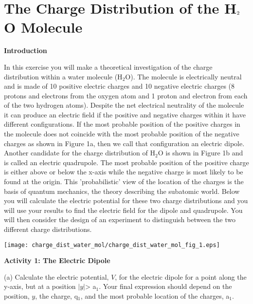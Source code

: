 
\section{The Charge Distribution of the H\protect\( _{2}\protect \)O Molecule}

\makelabheader %

\textbf{Introduction}

In this exercise you will make a theoretical investigation of the
charge distribution within a water molecule (H\( _{2} \)O). The molecule
is electrically neutral and is made of 10 positive electric charges
and 10 negative electric charges (8 protons and electrons from the
oxygen atom and 1 proton and electron from each of the two hydrogen
atoms). Despite the net electrical neutrality of the molecule it can
produce an electric field if the positive and negative charges within
it have different configurations. If the most probable position of
the positive charges in the molecule does not coincide with the most
probable position of the negative charges as shown in Figure 1a, then
we call that configuration an electric dipole. Another candidate for
the charge distribution of H\( _{2} \)O is shown in Figure 1b and
is called an electric quadrupole. The most probable position of the
positive charge is either above or below the x-axis while the negative
charge is most likely to be found at the origin. This 'probabilistic'
view of the location of the charges is the basis of quantum mechanics,
the theory describing the subatomic world. Below you will calculate
the electric potential for these two charge distributions and you
will use your results to find the electric field for the dipole and
quadrupole. You will then consider the design of an experiment to
distinguish between the two different charge distributions.

\vspace{0.3cm}
{\centering \texttt{[image: charge\_dist\_water\_mol/charge\_dist\_water\_mol\_fig\_1.eps]} \par}
\vspace{0.3cm}

\textbf{Activity 1: The Electric Dipole }

(a) Calculate the electric potential, \( V \), for the electric dipole for
a point along the y-axis, but at a position \( \left| y\right|  \)>
a\( _{1} \). Your final expression should depend on the position,
\( y \), the charge, q\( _{1} \), and the most probable location of the
charges, a\( _{1} \).
\vspace{40mm}

